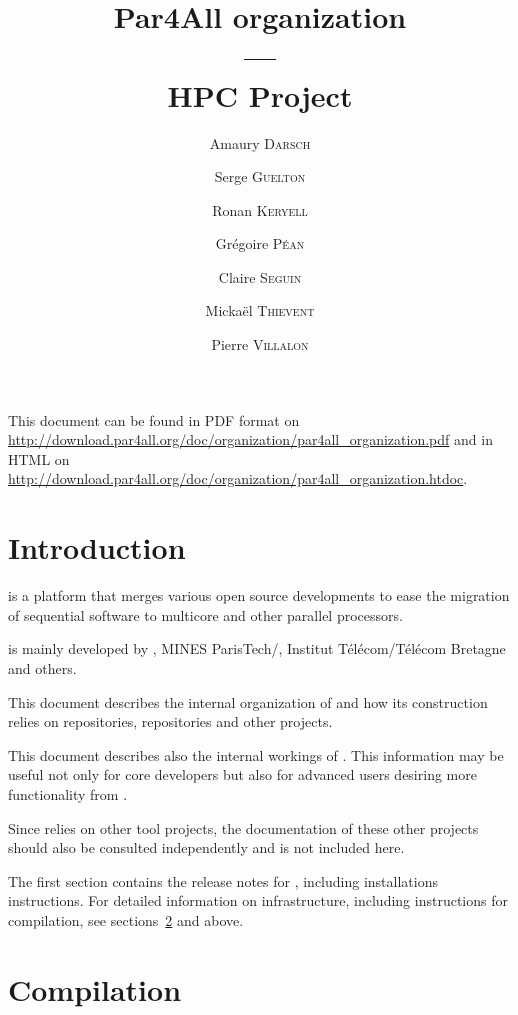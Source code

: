 \documentclass[a4paper]{article}
\newcommand{\LINK}[1]{\url{#1}\xspace}
\newcommand{\PfaOrganizationPDF}{\LINK{http://download.par4all.org/doc/organization/par4all_organization.pdf}}
\newcommand{\PfaAllOrganizationHTDOC}{\LINK{http://download.par4all.org/doc/organization/par4all_organization.htdoc}}
\begin{document}
\title{Par4All organization\\
  ---\\
  HPC Project}

\author{Amaury \textsc{Darsch} \and Serge \textsc{Guelton} \and Ronan
  \textsc{Keryell} \and Grégoire \textsc{Péan} \and Claire \textsc{Seguin}
  \and Mickaël \textsc{Thievent} \and Pierre \textsc{Villalon}}

\maketitle

This document can be found in PDF format on \PfaOrganizationPDF and in HTML
on \PfaAllOrganizationHTDOC.


\section{Introduction}
\label{sec:introduction}

\Apfa is a platform that merges various open source developments to ease
the migration of sequential software to multicore and other parallel
processors.

\Apfa is mainly developed by \Ahpcp, MINES ParisTech/\Acri, Institut
Télécom/Télécom Bretagne and others.

This document describes the internal organization of \Apfa and how its
construction relies on \Agit repositories, \Asvn repositories and other
projects.

This document describes also the internal workings of \Apfa.
This information may be useful not only for \Apfa core developers but
also for advanced users desiring more functionality from \Apfa.

Since \Apfa relies on other tool projects, the documentation of these other
projects should also be consulted independently and is not included here.

The first section contains the release notes for \Apfa, including
installations instructions. For detailed information on \Apfa
infrastructure, including instructions for compilation, see
sections~\ref{sec:compilation} and above.

\tableofcontents{}

\bigskip{}




\section{Compilation}
\label{sec:compilation}
\end{document}
